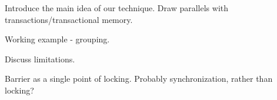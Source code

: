 
Introduce the main idea of our technique. Draw parallels with transactions/transactional memory. 

Working example - grouping. 

Discuss limitations.

Barrier as a single point of locking.  Probably synchronization, rather than locking?